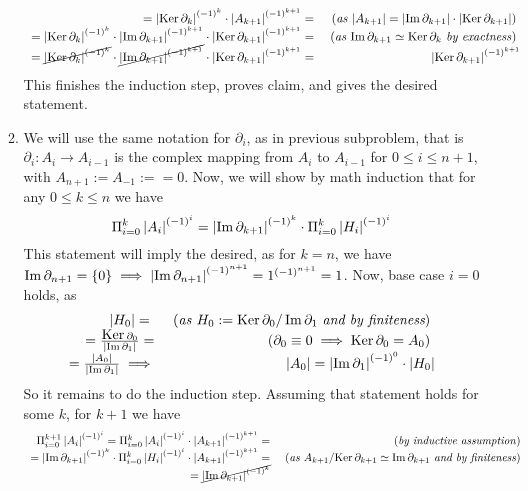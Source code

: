 \documentclass[8pt,fleqn]{article} %
\newcommand{\myexplain}[1]{\mbox{ (\textit{#1})}}
\begin{document}
\begin{enumerate}[label=\bfseries Problem \arabic*.]
\begin{enumerate}[label=(\arabic*).]
\[\begin{array}{rr}
			=\left|\mbox{\normalfont Ker\,}\partial_k\right|^{(-1)^k}\cdot\left|A_{k+1}\right|^{(-1)^{k+1}}=
			&\mbox{ (\textit{as $\left|A_{k+1}\right|=\left|\operatorname{Im}\partial_{k+1}\right|\cdot\left|\mbox{\normalfont Ker\,}\partial_{{k+1}}\right|$}) }\\
			={\left|\mbox{\normalfont Ker\,}\partial_k\right|^{(-1)^k}}\cdot{\left|\operatorname{Im}\partial_{k+1}\right|^{(-1)^{k+1}}}
				\cdot\left|\mbox{\normalfont Ker\,}\partial_{{k+1}}\right|^{(-1)^{k+1}}=
			&\mbox{ (\textit{as ${\operatorname{Im}\partial_{k+1}}\simeq{\mbox{\normalfont Ker\,}\partial_k}$ by exactness}) }\\
			=\cancel{\left|\mbox{\normalfont Ker\,}\partial_k\right|^{(-1)^k}}\cdot\cancel{\left|\operatorname{Im}\partial_{k+1}\right|^{(-1)^{k+1}}}
				\cdot\left|\mbox{\normalfont Ker\,}\partial_{{k+1}}\right|^{(-1)^{k+1}}=
			&\left|\mbox{\normalfont Ker\,}\partial_{{k+1}}\right|^{(-1)^{k+1}}
		\end{array}\]
		This finishes the induction step, proves claim, and gives the desired statement.
			\item We will use the same notation for $\partial_i$, as in previous subproblem, that is $\partial_i:A_i\to
				A_{i-1}$ is the complex mapping from $A_i$ to $A_{i-1}$ for $0\leq i\leq n+1$, with $A_{n+1}:=A_{-1}:=
				=0$. Now, we will show by math induction that for any $0\leq k\leq n$ we have
				\[\Pi_{i=0}^k\left|A_i\right|^{(-1)^i}=\left|\operatorname{Im}\partial_{k+1}\right|^{(-1)^{k}}\cdot
				\Pi_{i=0}^k\left|H_i\right|^{(-1)^i}\]
				This statement will imply the desired, as for $k=n$, we have $\operatorname{Im}\partial_{n+1}=\left\{0\right\}\implies
				\left|\operatorname{Im}\partial_{n+1}\right|^{(-1)^{n+1}}=1^{(-1)^{n+1}}=1$. Now, base case $i=0$ holds, as
		\[\begin{array}{rr}
			\left|H_0\right|=\
			&\mbox{ (\textit{as} $H_0:=\mbox{\normalfont Ker\,}\partial_0/\operatorname{Im}\partial_{1}$ {\it and by finiteness}) }\\
			=\frac{\mbox{\normalfont Ker\,}\partial_0}{\left|\operatorname{Im}\partial_1\right|}=
			&\mbox{ ({$\partial_0\equiv0\implies\mbox{\normalfont Ker\,}\partial_0=A_0$}) }\\
			=\frac{\left|A_0\right|}{\left|\operatorname{Im}\partial_1\right|}\implies&\left|A_0\right|=\left|\operatorname{Im}\partial_1\right|^{(-1)^0}\cdot\left|H_0\right|
		\end{array}\]
		So it remains to do the induction step. Assuming that statement holds for some $k$, for $k+1$ we have
		\noindent\[\begin{array}{rr}
		\Pi_{i=0}^{k+1}\myabs{A_i}^{(-1)^i}=\Pi_{i=0}^k\myabs{A_i}^{(-1)^i}\cdot\myabs{A_{k+1}}^{(-1)^{k+1}}=
		&\myexplain{by inductive assumption}\\
		=\myabs{\Im\partial_{k+1}}^{(-1)^{k}}\cdot\Pi_{i=0}^k\myabs{H_i}^{(-1)^i}\cdot\myabs{A_{k+1}}^{(-1)^{k+1}}=
		&\myexplain{as $A_{k+1}/\Ker\partial_{k+1}\simeq\Im\partial_{k+1}$ and by finiteness}\\
		=\cancel{\myabs{\Im\partial_{k+1}}^{(-1)^{k}}}

\end{array}\]
\end{enumerate}
\end{enumerate}
\end{document}
